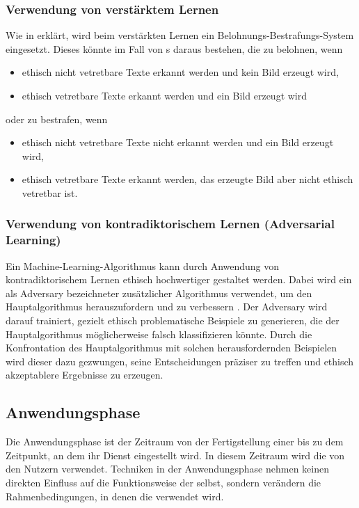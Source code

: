 \documentclass[hidelinks,12pt]{report}
\begin{document}
\subsubsection{Verwendung von verstärktem Lernen}
Wie in  erklärt, wird beim verstärkten Lernen ein Belohnungs-Bestrafungs-System eingesetzt. Dieses könnte im Fall von s daraus bestehen, die  zu belohnen, wenn 
\\
\begin{itemize}
	\item ethisch nicht vetretbare Texte erkannt werden und kein Bild erzeugt wird,
	\item ethisch vetretbare Texte erkannt werden und ein Bild erzeugt wird
\end{itemize}
oder zu bestrafen, wenn
\\
\begin{itemize}
	\item ethisch nicht vetretbare Texte nicht erkannt werden und ein Bild erzeugt wird,
	\item ethisch vetretbare Texte erkannt werden, das erzeugte Bild aber nicht ethisch vetretbar ist.
\end{itemize}  

\subsubsection{Verwendung von kontradiktorischem Lernen (Adversarial Learning)}
Ein Machine-Learning-Algorithmus kann durch Anwendung von kontradiktorischem Lernen ethisch hochwertiger gestaltet werden. Dabei wird ein als Adversary bezeichneter zusätzlicher Algorithmus verwendet, um den Hauptalgorithmus herauszufordern und zu verbessern \cite[S. 3]{Kurakin}. Der Adversary wird darauf trainiert, gezielt ethisch problematische Beispiele zu generieren, die der Hauptalgorithmus möglicherweise falsch klassifizieren könnte. Durch die Konfrontation des Hauptalgorithmus mit solchen herausfordernden Beispielen wird dieser dazu gezwungen, seine Entscheidungen präziser zu treffen und ethisch akzeptablere Ergebnisse zu erzeugen.
\\
\subsection{Anwendungsphase}
Die Anwendungsphase ist der Zeitraum von der Fertigstellung einer  bis zu dem Zeitpunkt, an dem ihr Dienst eingestellt wird. In diesem Zeitraum wird die  von den Nutzern verwendet. Techniken in der Anwendungsphase nehmen keinen direkten Einfluss auf die Funktionsweise der  selbst, sondern verändern die Rahmenbedingungen, in denen die  verwendet wird.
\\
\end{document}

